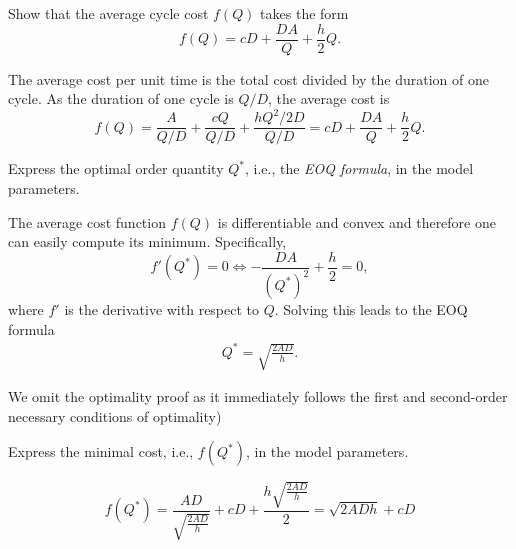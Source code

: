 \begin{exercise}
Show that the average cycle cost $f(Q)$ takes the form
\begin{equation*}
f(Q) =  cD + \frac{D A} Q + \frac h 2 Q.
\end{equation*}
  \begin{solution}
The average cost per unit time is the total cost divided by the duration of one cycle. As the duration of one cycle is $Q/D$, the average cost is
\begin{equation*}
f(Q) = \frac A{Q/D}+  \frac{cQ}{Q/D} + \frac{ h Q^2/2D}{Q/D} = cD + \frac{D A} Q + \frac h 2 Q.
\end{equation*}
  \end{solution}
\end{exercise}

\begin{exercise}
Express the optimal order quantity $Q^*$, i.e., the \emph{EOQ formula}, in the model parameters. 
\begin{solution}
The average cost function $f(Q)$ is differentiable and convex and therefore one can easily compute its minimum. Specifically, 
\begin{equation*}
  f'(Q^*) = 0 \iff - \frac{D A}{(Q^*)^2} + \frac h 2 = 0,
\end{equation*}
where $f'$ is the derivative with respect to $Q$. Solving this leads to the EOQ formula
\begin{align*}
Q^*=\sqrt{\frac{2AD}{h}}.
\end{align*}

We omit the optimality proof as it immediately follows the first and second-order necessary conditions of optimality) 
\end{solution}
\end{exercise}

\begin{exercise}
Express the minimal cost, i.e., $f(Q^*)$, in the model parameters. 
\begin{solution}
\begin{equation*}
f(Q^*) = \frac{AD}{\sqrt{\frac{2AD}{h}}}+cD+\frac{h\sqrt{\frac{2AD}{h}}}{2} = \sqrt{2ADh} + cD
\end{equation*}
\end{solution}
\end{exercise}


